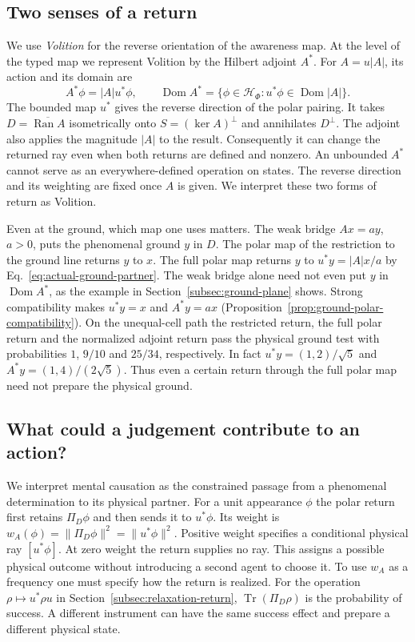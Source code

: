 \documentclass[11pt]{article}
\theoremstyle{definition}
\DeclareMathOperator{\Ran}{Ran}
\DeclareMathOperator{\Tr}{Tr}
\begin{document}
\subsection{Two senses of a return}
\label{subsec:volition-returns}

We use \emph{Volition} for the reverse orientation of the awareness map. At the level of the typed map we represent Volition by the Hilbert adjoint $A^*$. For $A=u|A|$, its action and its domain are
\begin{equation}
 A^*\phi=|A|u^*\phi,\qquad
 \operatorname{Dom}A^*=\{\phi\in\mathcal H_\Phi:u^*\phi\in\operatorname{Dom}|A|\}.
 \label{eq:weighted-volition}
\end{equation}
The bounded map $u^*$ gives the reverse direction of the polar pairing. It takes $D=\overline{\Ran A}$ isometrically onto $S=(\ker A)^\perp$ and annihilates $D^\perp$. The adjoint also applies the magnitude $|A|$ to the result. Consequently it can change the returned ray even when both returns are defined and nonzero. An unbounded $A^*$ cannot serve as an everywhere-defined operation on states. The reverse direction and its weighting are fixed once $A$ is given. We interpret these two forms of return as Volition.

Even at the ground, which map one uses matters. The weak bridge $Ax=ay$, $a>0$, puts the phenomenal ground $y$ in $D$. The polar map of the restriction to the ground line returns $y$ to $x$. The full polar map returns $y$ to $u^*y=|A|x/a$ by Eq.~\eqref{eq:actual-ground-partner}. The weak bridge alone need not even put $y$ in $\operatorname{Dom}A^*$, as the example in Section~\ref{subsec:ground-plane} shows. Strong compatibility makes $u^*y=x$ and $A^*y=ax$ (Proposition~\ref{prop:ground-polar-compatibility}). On the unequal-cell path the restricted return, the full polar return and the normalized adjoint return pass the physical ground test with probabilities $1$, $9/10$ and $25/34$, respectively. In fact $u^*y=(1,2)/\sqrt5$ and $A^*y=(1,4)/(2\sqrt5)$. Thus even a certain return through the full polar map need not prepare the physical ground.

\subsection{What could a judgement contribute to an action?}
\label{subsec:volition-actualization}

We interpret mental causation as the constrained passage from a phenomenal determination to its physical partner. For a unit appearance $\phi$ the polar return first retains $\Pi_D\phi$ and then sends it to $u^*\phi$. Its weight is $w_A(\phi)=\|\Pi_D\phi\|^2=\|u^*\phi\|^2$. Positive weight specifies a conditional physical ray $[u^*\phi]$. At zero weight the return supplies no ray. This assigns a possible physical outcome without introducing a second agent to choose it. To use $w_A$ as a frequency one must specify how the return is realized. For the operation $\rho\mapsto u^*\rho u$ in Section~\ref{subsec:relaxation-return}, $\Tr(\Pi_D\rho)$ is the probability of success. A different instrument can have the same success effect and prepare a different physical state.
\end{document}

